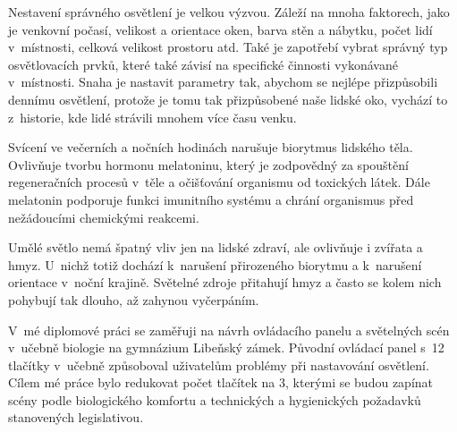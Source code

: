 
\medskip
Nestavení správného osvětlení je velkou výzvou. Záleží na mnoha faktorech, jako je venkovní počasí, velikost a orientace oken,
barva stěn a nábytku, počet lidí v~místnosti, celková velikost prostoru atd. Také je zapotřebí vybrat správný typ osvětlovacích prvků,
které také závisí na specifické činnosti vykonávané v~místnosti. Snaha je nastavit parametry tak, abychom se nejlépe přizpůsobili
dennímu osvětlení, protože je tomu tak přizpůsobené naše lidské oko, vychází to z~historie, kde lidé strávili mnohem více času venku.

\medskip
Svícení ve večerních a nočních hodinách narušuje biorytmus lidského těla. Ovlivňuje tvorbu hormonu melatoninu, který je
zodpovědný za spouštění regeneračních procesů v~těle a očišťování organismu od toxických látek. Dále melatonin podporuje
funkci imunitního systému a chrání organismus před nežádoucími chemickými reakcemi.

\medskip
Umělé světlo nemá špatný vliv jen na lidské zdraví, ale ovlivňuje i zvířata a hmyz. U~nichž totiž dochází k~narušení
přirozeného biorytmu a k~narušení orientace v~noční krajině. Světelné zdroje přitahují hmyz a často se kolem nich
pohybují tak dlouho, až zahynou vyčerpáním.


\medskip
V~mé diplomové práci se zaměřuji na návrh ovládacího panelu a světelných scén v~učebně biologie na
gymnázium Libeňský zámek. Původní ovládací panel s~12 tlačítky v~učebně způsoboval uživatelům problémy při
nastavování osvětlení. Cílem mé práce bylo redukovat počet tlačítek na 3, kterými se budou zapínat scény
podle biologického komfortu a technických a hygienických požadavků stanovených legislativou.

